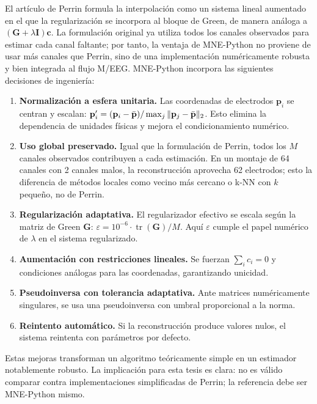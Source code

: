 El artículo de Perrin \cite{perrin1989} formula la interpolación como un sistema lineal aumentado en el que la regularización se incorpora al bloque de Green, de manera análoga a $(\mathbf{G}+\lambda\mathbf{I})\mathbf{c}$. La formulación original ya utiliza todos los canales observados para estimar cada canal faltante; por tanto, la ventaja de MNE-Python no proviene de usar más canales que Perrin, sino de una implementación numéricamente robusta y bien integrada al flujo M/EEG. MNE-Python incorpora las siguientes decisiones de ingeniería:
\begin{enumerate}[leftmargin=*,itemsep=2pt,topsep=4pt]
\item \textbf{Normalización a esfera unitaria.} Las coordenadas de electrodos $\mathbf{p}_i$ se centran y escalan: $\mathbf{p}_i' = (\mathbf{p}_i - \Bar{\mathbf{p}}) / \max_j \|\mathbf{p}_j - \Bar{\mathbf{p}}\|_2$. Esto elimina la dependencia de unidades físicas y mejora el condicionamiento numérico.
\item \textbf{Uso global preservado.} Igual que la formulación de Perrin, todos los $M$ canales observados contribuyen a cada estimación. En un montaje de 64 canales con 2 canales malos, la reconstrucción aprovecha 62 electrodos; esto la diferencia de métodos locales como vecino más cercano o k-NN con $k$ pequeño, no de Perrin.
\item \textbf{Regularización adaptativa.} El regularizador efectivo se escala según la matriz de Green $\mathbf{G}$: $\varepsilon = 10^{-6} \cdot \operatorname{tr}(\mathbf{G}) / M$. Aquí $\varepsilon$ cumple el papel numérico de $\lambda$ en el sistema regularizado.
\item \textbf{Aumentación con restricciones lineales.} Se fuerzan $\sum_i c_i = 0$ y condiciones análogas para las coordenadas, garantizando unicidad.
\item \textbf{Pseudoinversa con tolerancia adaptativa.} Ante matrices numéricamente singulares, se usa una pseudoinversa con umbral proporcional a la norma.
\item \textbf{Reintento automático.} Si la reconstrucción produce valores nulos, el sistema reintenta con parámetros por defecto.
\end{enumerate}

Estas mejoras transforman un algoritmo teóricamente simple en un estimador notablemente robusto. La implicación para esta tesis es clara: no es válido comparar contra implementaciones simplificadas de Perrin; la referencia debe ser MNE-Python mismo.

